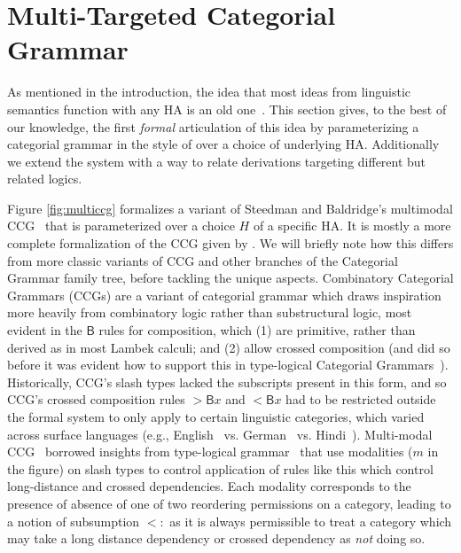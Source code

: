 \documentclass[11pt,a4paper,acceptedWithA]{article}
\newcommand{\ha}{\textsc{HA}\xspace}
\newcommand{\ccg}{\textsc{CCG}\xspace}
\newcommand{\ccgs}{\textsc{CCG}s\xspace}
\begin{document}
\section{Multi-Targeted Categorial Grammar}
\label{sec:multitarget}

As mentioned in the introduction, the idea that most ideas from linguistic semantics function with any \ha is an old one~\cite{lambek1988categorial}.
This section gives, to the best of our knowledge, the first \emph{formal} articulation of this idea by parameterizing a categorial grammar in the style of \cite{steedman2012taking} over a choice of underlying \ha. Additionally we extend the system with a way to relate derivations targeting different but related logics.

Figure \ref{fig:multiccg} formalizes a variant of Steedman and Baldridge's multimodal \ccg~\cite{Baldridge:2003:MCC:1067807.1067836,baldridge2002lexically,steedman2012taking} that is parameterized over a choice $H$ of a specific \ha.
It is mostly a more complete formalization of the \ccg given by \citet{steedman2012taking}.  We will briefly note how this differs from more classic variants of \ccg and other branches of the Categorial Grammar family tree, before tackling the unique aspects.
Combinatory Categorial Grammars (\ccgs) are a variant of categorial grammar which draws inspiration more heavily from combinatory logic rather than substructural logic, most evident in the $\mathsf{B}$ rules for composition, which (1) are primitive, rather than derived as in most Lambek calculi; and (2) allow crossed composition (and did so before it was evident how to support this in type-logical Categorial Grammars~\cite{steedman-ccg:1987}).
Historically, \ccg's slash types lacked the subscripts present in this form, and so \ccg's crossed composition rules $>\mathsf{B}x$ and $<\mathsf{B}x$ had to be restricted outside the formal system to only apply to certain linguistic categories, which varied across surface languages (e.g., English~\cite{hockenmaier2007ccgbank} vs. German~\cite{hockenmaier2006creating} vs. Hindi~\cite{ambati2018hindi}).
Multi-modal \ccg~\cite{baldridge2002lexically,Baldridge:2003:MCC:1067807.1067836} borrowed insights from type-logical grammar~ that use modalities ($m$ in the figure) on slash types to control application of rules like this which control long-distance and crossed dependencies.
Each modality corresponds to the presence of absence of one of two reordering permissions on a category, leading to a notion of subsumption $<:$ as it is always permissible to treat a category which may take a long distance dependency or crossed dependency as \emph{not} doing so.
\end{document}
